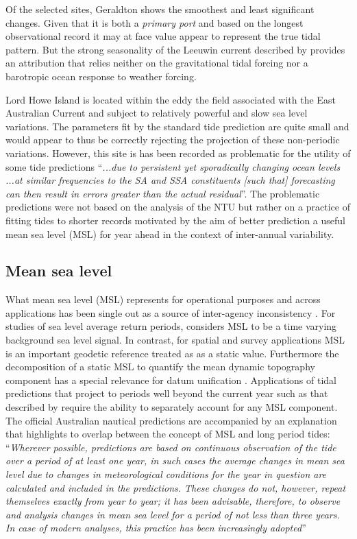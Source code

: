 Of the selected sites, Geraldton shows the smoothest and least significant changes.  Given that it is both a \textit{primary port} and based on the longest observational record it may at face value appear to represent the true tidal pattern. But the strong seasonality of the Leeuwin current described by \citeauthor{Ridgway:2004kb} provides an attribution that relies neither on the gravitational tidal forcing nor a barotropic ocean response to weather forcing. %

Lord Howe Island is located within the eddy the field associated with the East Australian Current and subject to relatively powerful and slow sea level variations.    The parameters fit by the standard tide prediction are quite small and would appear to thus be correctly rejecting the projection of these  non-periodic variations.   However, this site is has been recorded as problematic for the utility of some tide predictions ``\textit{...due to persistent yet sporadically changing ocean levels ...at similar frequencies to the SA and SSA constituents [such that] forecasting can then result in errors greater than the actual residual}''\cite{MHL2156}.  The problematic predictions were not based on the analysis of the NTU but rather on a practice of fitting tides to shorter records motivated by the aim of better prediction a useful mean sea level (MSL) for year ahead in the context of inter-annual variability.

\subsection{Mean sea level}
\label{Sec:MSL}
What mean sea level (MSL) represents for operational purposes and across applications has been single out as a source of inter-agency inconsistency \cite{MHL2156}.
For studies of sea level average return periods, \citeauthor{Haigh:2013bn} considers MSL to be a time varying background sea level signal.
In contrast, for spatial and survey applications MSL is an important geodetic reference treated as as a static value. Furthermore the decomposition of a static MSL to quantify the mean dynamic topography component has a special relevance for datum unification \cite{Filmer:2018cu}.
Applications of tidal predictions that project to periods well beyond the current year such as that described by \citeauthor{10.1007/s11069-021-04600-4} require the ability to separately account for any MSL component.
The official Australian nautical predictions are accompanied by an explanation that highlights to overlap between the concept of MSL and long period tides:
``\textit{Wherever possible, predictions are based on continuous observation of the tide over a period of at least one year, in such cases the average changes in mean sea level due to changes in meteorological conditions for the year in question are calculated and included in the predictions.  These changes do not, however, repeat themselves exactly from year to year; it has been advisable, therefore, to observe and analysis changes in mean sea level for a period of not less than three years.   In case of modern analyses, this practice has been increasingly adopted}'' \cite{austides}

